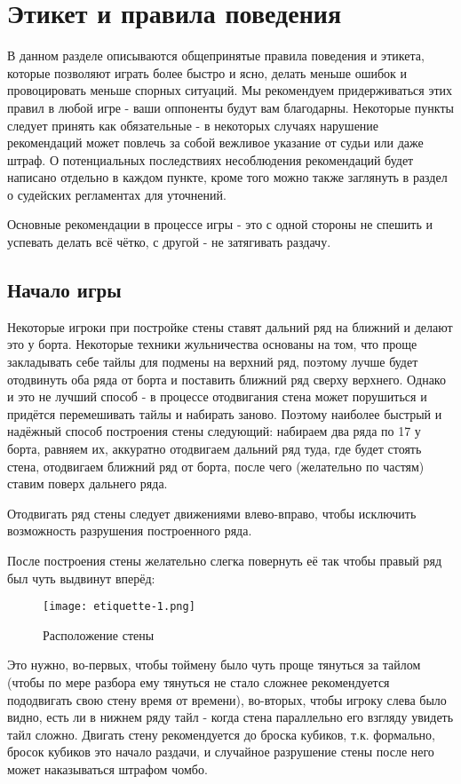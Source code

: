 \section{Этикет и правила поведения}

В данном разделе описываются общепринятые правила поведения и этикета, которые позволяют играть более быстро и ясно, делать меньше ошибок и провоцировать меньше спорных ситуаций. Мы рекомендуем придерживаться этих правил в любой игре - ваши оппоненты будут вам благодарны. Некоторые пункты следует принять как обязательные - в некоторых случаях нарушение рекомендаций может повлечь за собой вежливое указание от судьи или даже штраф. О потенциальных последствиях несоблюдения рекомендаций будет написано отдельно в каждом пункте, кроме того можно также заглянуть в раздел о судейских регламентах для уточнений.

Основные рекомендации в процессе игры - это с одной стороны не спешить и успевать делать всё чётко, с другой - не затягивать раздачу. 

\subsection {Начало игры}

Некоторые игроки при постройке стены ставят дальний ряд на ближний и делают это у борта. Некоторые техники жульничества основаны на том, что проще закладывать себе тайлы для подмены на верхний ряд, поэтому лучше будет отодвинуть оба ряда от борта и поставить ближний ряд сверху верхнего. Однако и это не лучший способ - в процессе отодвигания стена может порушиться и придётся перемешивать тайлы и набирать заново. Поэтому наиболее быстрый и надёжный способ построения стены следующий: набираем два ряда по 17 у борта, равняем их, аккуратно отодвигаем дальний ряд туда, где будет стоять стена, отодвигаем ближний ряд от борта, после чего (желательно по частям) ставим поверх дальнего ряда. 

Отодвигать ряд стены следует движениями влево-вправо, чтобы исключить возможность разрушения построенного ряда.

После построения стены желательно слегка повернуть её так чтобы правый ряд был чуть выдвинут вперёд:

\begin{figure}[H]
	\centering
	\texttt{[image: etiquette-1.png]}
	\caption{Расположение стены}
\end{figure}

Это нужно, во-первых, чтобы тоймену было чуть проще тянуться за тайлом (чтобы по мере разбора ему тянуться не стало сложнее рекомендуется пододвигать свою стену время от времени), во-вторых, чтобы игроку слева было видно, есть ли в нижнем ряду тайл - когда стена параллельно его взгляду увидеть тайл сложно. Двигать стену рекомендуется до броска кубиков, т.к. формально, бросок кубиков это начало раздачи, и случайное разрушение стены после него может наказываться штрафом чомбо. 

